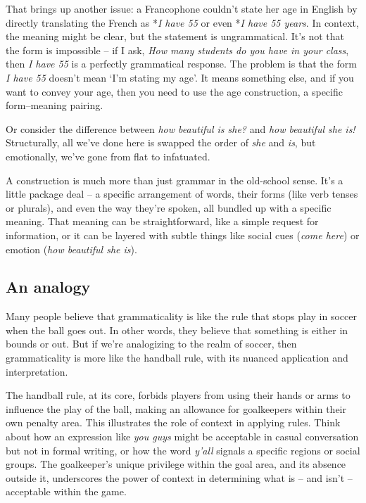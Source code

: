 That brings up another issue: a Francophone couldn't state her age in English by directly translating the French as *\textit{I have 55} or even *\textit{I have 55 years}. In context, the meaning might be clear, but the statement is ungrammatical. It's not that the form is impossible -- if I ask, \textit{How many students do you have in your class}, then \textit{I have 55} is a perfectly grammatical response. The problem is that the form \textit{I have 55} doesn't mean `I'm stating my age'. It means something else, and if you want to convey your age, then you need to use the age construction, a specific form--meaning pairing.

\bigskip

Or consider the difference between \textit{how beautiful is she?} and \textit{how beautiful she is!} Structurally, all we've done here is swapped the order of \textit{she} and \textit{is}, but emotionally, we've gone from flat to infatuated.

\bigskip

A construction is much more than just grammar in the old-school sense. It's a little package deal -- a specific arrangement of words, their forms (like verb tenses or plurals), and even the way they're spoken, all bundled up with a specific meaning. That meaning can be straightforward, like a simple request for information, or it can be layered with subtle things like social cues (\textit{come here}) or emotion (\textit{how beautiful she is}).

\subsection{An analogy}

Many people believe that grammaticality is like the rule that stops play in soccer when the ball goes out. In other words, they believe that something is either in bounds or out. But if we're analogizing to the realm of soccer, then grammaticality is more like the handball rule, with its nuanced application and interpretation.

The handball rule, at its core, forbids players from using their hands or arms to influence the play of the ball, making an allowance for goalkeepers within their own penalty area. This illustrates the role of context in applying rules. Think about how an expression like \textit{you guys} might be acceptable in casual conversation but not in formal writing, or how the word \textit{y'all} signals a specific regions or social groups. The goalkeeper's unique privilege within the goal area, and its absence outside it, underscores the power of context in determining what is -- and isn't -- acceptable within the game.

